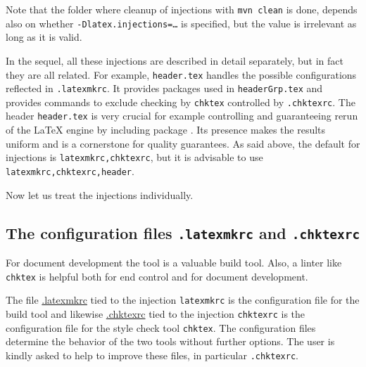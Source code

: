 Note that the folder where cleanup of injections with \texttt{mvn clean} is done, 
depends also on whether \texttt{-Dlatex.injections=\dots} is specified, 
but the value is irrelevant as long as it is valid. 

In the sequel, all these injections are described in detail separately, 
but in fact they are all related. 
For example, \texttt{header.tex} handles the possible configurations 
reflected in \texttt{.latexmkrc}. 
It provides packages used in \texttt{headerGrp.tex} 
and provides commands to exclude checking by \texttt{chktex} 
controlled by \texttt{.chktexrc}. 
The header \texttt{header.tex} is very crucial 
for example controlling and guaranteeing rerun of the \LaTeX{} engine 
by including package . 
Its presence makes the results uniform and is a cornerstone for quality guarantees. 
As said above, the default for injections is \texttt{latexmkrc,chktexrc}, 
but it is advisable to use \texttt{latexmkrc,chktexrc,header}. 





Now let us treat the injections individually. 



\subsection{The configuration files \texttt{.latexmkrc} and \texttt{.chktexrc}}\label{subsec:latChkRc}

For document development the tool  is a valuable build tool. 
Also, a linter like \texttt{chktex} is helpful 
both for end control and for document development. 

The file \href{\urlSite fromTex/.latexmkrc}{.latexmkrc} tied to the injection \texttt{latexmkrc} 
is the configuration file for the build tool  
and likewise \href{\urlSite fromTex/.chktexrc}{.chktexrc} tied to the injection \texttt{chktexrc} 
is the configuration file for the style check tool \texttt{chktex}. 
The configuration files determine the behavior of the two tools without further options. 
The user is kindly asked to help to improve these files, in particular \texttt{.chktexrc}. 

